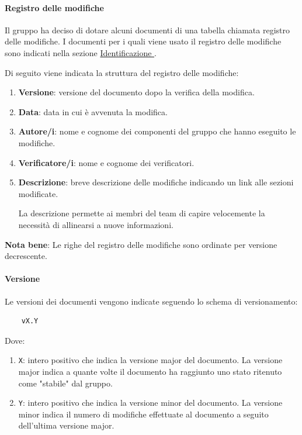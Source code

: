 \paragraph{Registro delle modifiche}
\label{par:registro_delle_modifiche}
Il gruppo ha deciso di dotare alcuni documenti di una tabella chiamata registro delle modifiche.
I documenti per i quali viene usato il registro delle modifiche sono indicati nella sezione \hyperref[subsubsec:identificazione_CI]{Identificazione }.

Di seguito viene indicata la struttura del registro delle modifiche:
\begin{enumerate}
    \item \textbf{Versione}: versione del documento dopo la verifica della modifica.
    \item \textbf{Data}: data in cui è avvenuta la modifica.
    \item \textbf{Autore/i}: nome e cognome dei componenti del gruppo che hanno eseguito le modifiche.
    \item \textbf{Verificatore/i}: nome e cognome dei verificatori.
    \item \textbf{Descrizione}: breve descrizione delle modifiche indicando un link alle sezioni modificate.
    
    La descrizione permette ai membri del team di capire velocemente la necessità di allinearsi a nuove informazioni. 
\end{enumerate} 
\textbf{Nota bene}: Le righe del registro delle modifiche sono ordinate per versione decrescente.

\paragraph{Versione}
\label{par:versione_documenti}
Le versioni dei documenti vengono indicate seguendo lo schema di versionamento:
\begin{lstlisting}
    vX.Y
\end{lstlisting}
Dove:
\begin{enumerate}
    \item \texttt{X}: intero positivo che indica la versione major del documento.
    La versione major indica a quante volte il documento ha raggiunto uno stato ritenuto come "stabile" dal gruppo.

    \item \texttt{Y}: intero positivo che indica la versione minor del documento.
    La versione minor indica il numero di modifiche effettuate al documento a seguito dell'ultima versione major.
\end{enumerate}


